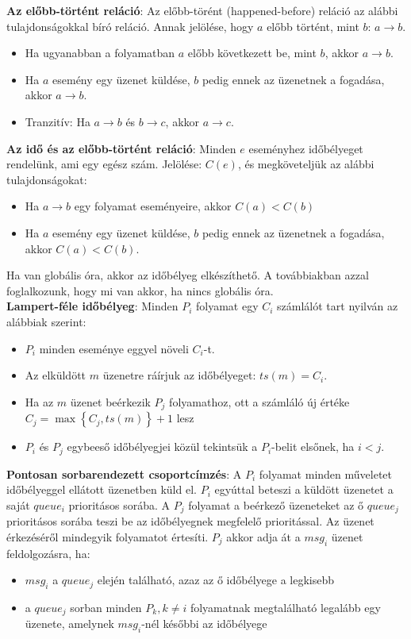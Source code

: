 \documentclass[margin=0px]{article}
\begin{document}
\noindent \textbf{Az előbb-történt reláció}: Az előbb-törént (happened-before) reláció az alábbi tulajdonságokkal bíró reláció.
Annak jelölése, hogy $a$ előbb történt, mint $b$: $a \to b$.

\begin{itemize}
    \item	Ha ugyanabban a folyamatban $a$ előbb következett be, mint $b$, akkor $a \to b$.
    \item	Ha $a$ esemény egy üzenet küldése, $b$ pedig ennek az üzenetnek a fogadása, akkor $a \to b$.
    \item	Tranzitív: Ha $a \to b$ és $b \to c$, akkor $a \to c$.
\end{itemize}

\noindent \textbf{Az idő és az előbb-történt reláció}: Minden $e$ eseményhez időbélyeget rendelünk, ami egy egész szám. Jelölése:
$C(e)$, és megköveteljük az alábbi tulajdonságokat:

\begin{itemize}
    \item	Ha $a \to b$ egy folyamat eseményeire, akkor $C(a)<C(b)$
    \item	Ha $a$ esemény egy üzenet küldése, $b$ pedig ennek az üzenetnek a fogadása, akkor $C(a)<C(b)$.
\end{itemize}

Ha van globális óra, akkor az időbélyeg elkészíthető. A továbbiakban azzal foglalkozunk, hogy mi van akkor, ha nincs globális
óra.\\

\noindent \textbf{Lampert-féle időbélyeg}: Minden $P_{i}$ folyamat egy $C_{i}$ számlálót tart nyilván az alábbiak szerint:
\begin{itemize}
    \item	$P_{i}$ minden eseménye eggyel növeli $C_{i}$-t.
    \item	Az elküldött $m$ üzenetre ráírjuk az időbélyeget: $ts(m) = C_{i}$.
    \item	Ha az $m$ üzenet beérkezik $P_{j}$ folyamathoz, ott a számláló új értéke
          $C_{j} = \max \left\{C_{j},ts(m)\right\}+1$ lesz
    \item	$P_{i}$ és $P_{j}$ egybeeső időbélyegjei közül tekintsük a $P_{i}$-belit elsőnek, ha $i<j$.
\end{itemize}

\noindent \textbf{Pontosan sorbarendezett csoportcímzés}: A $P_{i}$ folyamat minden műveletet időbélyeggel ellátott
üzenetben küld el. $P_{i}$ egyúttal beteszi a küldött üzenetet a saját $queue_{i}$ prioritásos sorába. A $P_{j}$
folyamat a beérkező üzeneteket az ő $queue_{j}$ prioritásos sorába teszi be az időbélyegnek megfelelő prioritással.
Az üzenet érkezéséről mindegyik folyamatot értesíti.
$P_{j}$ akkor adja át a $msg_{i}$ üzenet feldolgozásra, ha:
\begin{itemize}
    \item	$msg_{i}$ a $queue_{j}$ elején található, azaz az ő időbélyege a legkisebb
    \item	a $queue_{j}$ sorban minden $P_{k}, k \not = i$ folyamatnak megtalálható legalább egy üzenete, amelynek
          $msg_{i}$-nél későbbi az időbélyege

\end{itemize}
\end{document}
